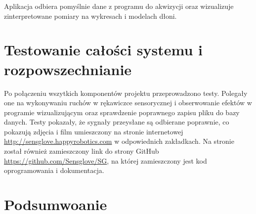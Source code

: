 \documentclass{article}
\begin{document}
Aplikacja odbiera pomyślnie dane z programu do akwizycji oraz wizualizuje zinterpretowane pomiary na wykresach i modelach dłoni. 





\section{Testowanie całości systemu i rozpowszechnianie}
Po połączeniu wszytkich komponentów projektu przeprowadzono testy. Polegały one na wykonywaniu ruchów w rękawiczce sensorycznej i obserwowanie efektów w programie wizualizującym oraz sprawdzenie poprawnego zapisu pliku do bazy danych. Testy pokazały, że sygnały przeysłane są odbierane poprawnie, co pokazują zdjęcia i film umieszczony na stronie internetowej  \url{http://sensglove.happyrobotics.com} w odpowiednich zakładkach. Na stronie został również zamieszczony link do strony GitHub \url{https://github.com/Sensglove/SG}, na której zamieszczony jest kod oprogramowania i dokumentacja.

\section{Podsumwoanie}
\end{document}

